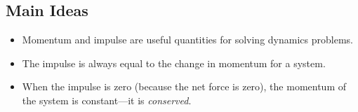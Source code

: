 \documentclass[]{article}
\begin{document}
\newpage
\begin{TeacherMargin}

\end{TeacherMargin}
\begin{PresentSpace}
\section*{Main Ideas}
\begin{itemize}
	\item Momentum and impulse are useful quantities for solving dynamics problems.
	\item The impulse is always equal to the change in momentum for a system.
	\item When the impulse is zero (because the net force is zero), the momentum of the system is constant---it is \textit{conserved}.
\end{itemize}
\end{PresentSpace}
\end{document}
